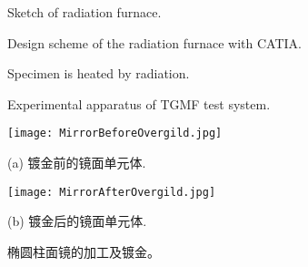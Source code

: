 \begin{figure}[!htp]
\centering{}
\caption{Sketch of radiation furnace.}
\label{Fig:Radiation_Furnace}
\end{figure}

\begin{figure}[!htp]
\centering{}
\caption{Design scheme of the radiation furnace with CATIA.}
\label{Fig:DesignWithCAITA}
\end{figure}

\begin{figure}[!htp]
\centering{}
\caption{Specimen is heated by radiation.}
\label{Fig:Heating_Specimen}
\end{figure}

\begin{figure}[!htp]
\centering{}
\caption{Experimental apparatus of TGMF test system.}
\label{Fig:TGMF_Test_System}
\end{figure}

\begin{figure}
  \begin{minipage}[t]{0.5\linewidth} %
  \nonumber
    \centering
    \texttt{[image: MirrorBeforeOvergild.jpg]}
    \centerline{(a) 镀金前的镜面单元体.}
    \label{fig:side:a}
  \end{minipage}%
  \begin{minipage}[t]{0.5\linewidth}
    \centering
    \texttt{[image: MirrorAfterOvergild.jpg]}
    \centerline{(b) 镀金后的镜面单元体.}
    \label{fig:side:b}
  \end{minipage}

  \caption{椭圆柱面镜的加工及镀金。}
  \label{Fig:MirrorOvergild}
\end{figure}


\newpage
